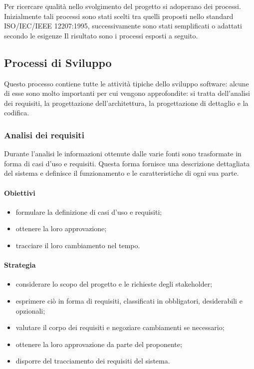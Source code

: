 Per ricercare qualità nello svolgimento del progetto si adoperano dei processi. Inizialmente tali processi sono stati scelti tra quelli proposti nello standard ISO/IEC/IEEE 12207:1995,
successivamente sono stati semplificati o adattati secondo le esigenze
Il risultato sono i processi esposti a seguito.
\subsection{Processi di Sviluppo}
    Questo processo contiene tutte le attività tipiche dello sviluppo software: alcune di esse sono molto importanti per cui vengono approfondite: si tratta dell'analisi dei requisiti,
    la progettazione dell'architettura, la progettazione di dettaglio e la codifica.
    \subsubsection{Analisi dei requisiti}
        Durante l'analisi le informazioni ottenute dalle varie fonti sono trasformate in forma di casi d'uso e requisiti.
        Questa forma fornisce una descrizione dettagliata del sistema e definisce il funzionamento e le caratteristiche di ogni sua parte.
        \paragraph{Obiettivi}
            \begin{itemize}
                \item formulare la definizione di casi d'uso e requisiti;
                \item ottenere la loro approvazione;
                \item tracciare il loro cambiamento nel tempo.
            \end{itemize}
        \paragraph{Strategia}
            \begin{itemize}
                \item considerare lo scopo del progetto e le richieste degli stakeholder;
                \item esprimere ciò in forma di requisiti, classificati in obbligatori, desiderabili e opzionali;
                \item valutare il corpo dei requisiti e negoziare cambiamenti se necessario;
                \item ottenere la loro approvazione da parte del proponente;
                \item disporre del tracciamento dei requisiti del sistema.
            \end{itemize}
